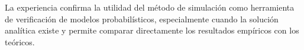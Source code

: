 \documentclass[a4paper, 11pt]{article}
\begin{document}
La experiencia confirma la utilidad del método de simulación como herramienta
de verificación de modelos probabilísticos, especialmente cuando la solución
analítica existe y permite comparar directamente los resultados empíricos con
los teóricos.



\end{document}

